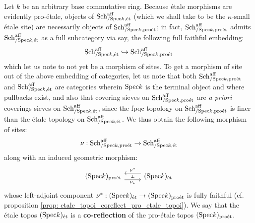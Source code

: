                     \begin{remark} \label{remark: etale_comparison_site_morphism}
                        Let $k$ be an arbitrary base commutative ring. Because \'etale morphisms are evidently pro-\'etale, objects of $\mathrm{Sch}^{\mathrm{aff}}_{/\mathrm{Spec} k, \mathrm{\acute{e}t}}$ (which we shall take to be the $\kappa$-small \'etale site) are necessarily objects of $\mathrm{Sch}^{\mathrm{aff}}_{/\mathrm{Spec} k, \mathrm{pro\acute{e}t}}$; in fact, $\mathrm{Sch}^{\mathrm{aff}}_{/\mathrm{Spec} k, \mathrm{pro\acute{e}t}}$ admits $\mathrm{Sch}^{\mathrm{aff}}_{/\mathrm{Spec} k, \mathrm{\acute{e}t}}$ as a full subcategory via say, the following full faithful embedding:
                            $$\mathrm{Sch}^{\mathrm{aff}}_{/\mathrm{Spec} k, \mathrm{\acute{e}t}} \hookrightarrow \mathrm{Sch}^{\mathrm{aff}}_{/\mathrm{Spec} k, \mathrm{pro\acute{e}t}}$$
                        which let us note to not yet be a morphism of sites. To get a morphism of site out of the above embedding of categories, let us note that both $\mathrm{Sch}^{\mathrm{aff}}_{/\mathrm{Spec} k, \mathrm{pro\acute{e}t}}$ and $\mathrm{Sch}^{\mathrm{aff}}_{/\mathrm{Spec} k, \mathrm{\acute{e}t}}$ are categories wherein $\mathrm{Spec} k$ is the terminal object and where pullbacks exist, and also that covering sieves on $\mathrm{Sch}^{\mathrm{aff}}_{/\mathrm{Spec} k, \mathrm{pro\acute{e}t}}$ are \textit{a priori} coverings sieves on $\mathrm{Sch}^{\mathrm{aff}}_{/\mathrm{Spec} k, \mathrm{\acute{e}t}}$, since the fpqc topology on $\mathrm{Sch}^{\mathrm{aff}}_{/\mathrm{Spec} k, \mathrm{pro\acute{e}t}}$ is finer than the \'etale topology on $\mathrm{Sch}^{\mathrm{aff}}_{/\mathrm{Spec} k, \mathrm{\acute{e}t}}$. We thus obtain the following morphism of sites:
                            $$\nu: \mathrm{Sch}^{\mathrm{aff}}_{/\mathrm{Spec} k, \mathrm{pro\acute{e}t}} \to \mathrm{Sch}^{\mathrm{aff}}_{/\mathrm{Spec} k, \mathrm{\acute{e}t}}$$
                        along with an induced geometric morphism:
                            $$
                                \begin{tikzcd}
                                	{(\Spec k)_{\proet}} & {(\Spec k)_{\et}}
                                	\arrow[""{name=0, anchor=center, inner sep=0}, "{\nu_*}"', shift right=2, from=1-1, to=1-2]
                                	\arrow[""{name=1, anchor=center, inner sep=0}, "{\nu^*}"', shift right=2, from=1-2, to=1-1]
                                	\arrow["\dashv"{anchor=center, rotate=-90}, draw=none, from=1, to=0]
                                \end{tikzcd}
                            $$
                        whose left-adjoint component $\nu^*: (\mathrm{Spec} k)_{\mathrm{\acute{e}t}} \to (\mathrm{Spec} k)_{\mathrm{pro\acute{e}t}}$ is fully faithful (cf. proposition \ref{prop: etale_topoi_coreflect_pro_etale_topoi}). We say that the \'etale topos $(\mathrm{Spec} k)_{\mathrm{\acute{e}t}}$ is a \textbf{co-reflection} of the pro-\'etale topos $(\mathrm{Spec} k)_{\mathrm{pro\acute{e}t}}$.
                    \end{remark}
                    
